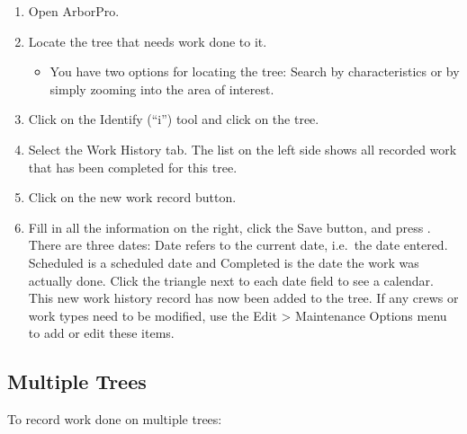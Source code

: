 \documentclass[]{book}
\providecommand{\tightlist}{%
  \setlength{\itemsep}{0pt}\setlength{\parskip}{0pt}}
\begin{document}
\begin{enumerate}
\def\labelenumi{\arabic{enumi}.}
\tightlist
\item
  Open ArborPro.
\item
  Locate the tree that needs work done to it.

  \begin{itemize}
  \tightlist
  \item
    You have two options for locating the tree: Search by
    characteristics or by simply zooming into the area of interest.
  \end{itemize}
\item
  Click on the Identify (``i'') tool and click on the tree.
\item
  Select the Work History tab. The list on the left side shows all
  recorded work that has been completed for this tree.
\item
  Click on the new work record button.
\item
  Fill in all the information on the right, click the Save button, and
  press . There are three dates: Date refers to the current date,
  i.e.~the date entered. Scheduled is a scheduled date and Completed is
  the date the work was actually done. Click the triangle next to each
  date field to see a calendar. This new work history record has now
  been added to the tree. If any crews or work types need to be
  modified, use the Edit \textgreater{} Maintenance Options menu to add
  or edit these items.
\end{enumerate}

\hypertarget{multiple-trees}{%
\subsection{Multiple Trees}\label{multiple-trees}}

To record work done on multiple trees:
\end{document}
